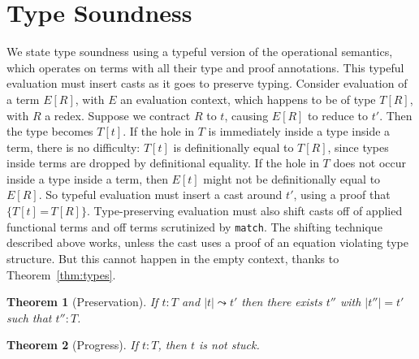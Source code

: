 \documentclass[preprint,natbib]{sigplanconf}
\newcommand{\optt}{\textsc{OpTT}}
\newcommand{\Eq}[0]{\texttt{=}}
\newtheorem{theorem}{Theorem}
\begin{document}


\section{Type Soundness}
\label{sec:typesound}

We state type soundness using a typeful version of the operational
semantics, which operates on terms with all their type and proof
annotations.  This typeful evaluation must insert casts as it goes to
preserve typing.  Consider evaluation of a term $E[R]$, with $E$ an
evaluation context, which happens to be of type $T[R]$, with $R$ a
redex.  Suppose we contract $R$ to $t$, causing $E[R]$ to reduce to
$t'$.  Then the type becomes $T[t]$.  If the hole in $T$ is
immediately inside a type inside a term, there is no difficulty:
$T[t]$ is definitionally equal to $T[R]$, since types inside terms are
dropped by definitional equality.  If the hole in $T$ does not occur
inside a type inside a term, then $E[t]$ might not be definitionally
equal to $E[R]$.  So typeful evaluation must insert a cast around
$t'$, using a proof that $\{ T[t]\,\Eq\,T[R]\}$.  Type-preserving
evaluation must also shift casts off of applied functional terms and
off terms scrutinized by \texttt{match}.  The shifting technique
described above works, unless the cast uses a proof of an equation
violating type structure.  But this cannot happen in the empty
context, thanks to Theorem~\ref{thm:types}.

\begin{theorem}[Preservation]
If $t:T$ and $|t|\leadsto t'$ 
then there exists $t''$ with $|t''| = t'$ such that $t'' : T$.
\end{theorem}

\begin{theorem}[Progress]
If $t:T$, then $t$ is not stuck.
\end{theorem}
\end{document}
